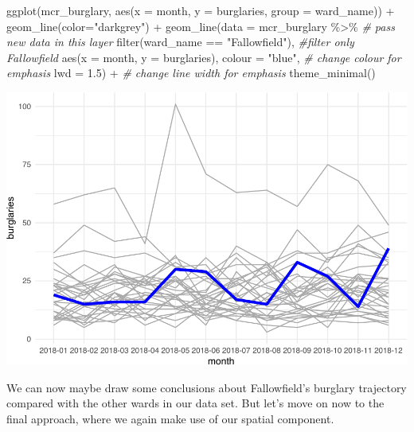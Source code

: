 \documentclass[
]{book}
\newenvironment{Shaded}{\begin{snugshade}}{\end{snugshade}}
\newcommand{\AttributeTok}[1]{\textcolor[rgb]{0.77,0.63,0.00}{#1}}
\newcommand{\CommentTok}[1]{\textcolor[rgb]{0.56,0.35,0.01}{\textit{#1}}}
\newcommand{\FloatTok}[1]{\textcolor[rgb]{0.00,0.00,0.81}{#1}}
\newcommand{\FunctionTok}[1]{\textcolor[rgb]{0.00,0.00,0.00}{#1}}
\newcommand{\NormalTok}[1]{#1}
\newcommand{\SpecialCharTok}[1]{\textcolor[rgb]{0.00,0.00,0.00}{#1}}
\newcommand{\StringTok}[1]{\textcolor[rgb]{0.31,0.60,0.02}{#1}}
\begin{document}
\begin{Shaded}
\begin{Highlighting}[]
\FunctionTok{ggplot}\NormalTok{(mcr\_burglary, }
       \FunctionTok{aes}\NormalTok{(}\AttributeTok{x =}\NormalTok{ month, }
           \AttributeTok{y =}\NormalTok{ burglaries, }
           \AttributeTok{group =}\NormalTok{ ward\_name)) }\SpecialCharTok{+} 
  \FunctionTok{geom\_line}\NormalTok{(}\AttributeTok{color=}\StringTok{"darkgrey"}\NormalTok{) }\SpecialCharTok{+} 
  \FunctionTok{geom\_line}\NormalTok{(}\AttributeTok{data =}\NormalTok{ mcr\_burglary }\SpecialCharTok{\%\textgreater{}\%}    \CommentTok{\# pass new data in this layer}
              \FunctionTok{filter}\NormalTok{(ward\_name }\SpecialCharTok{==} \StringTok{"Fallowfield"}\NormalTok{),  }\CommentTok{\#filter only Fallowfield }
            \FunctionTok{aes}\NormalTok{(}\AttributeTok{x =}\NormalTok{ month, }
           \AttributeTok{y =}\NormalTok{ burglaries), }
           \AttributeTok{colour =} \StringTok{"blue"}\NormalTok{,  }\CommentTok{\# change colour for emphasis}
           \AttributeTok{lwd =} \FloatTok{1.5}\NormalTok{) }\SpecialCharTok{+} \CommentTok{\# change line width for emphasis}
  \FunctionTok{theme\_minimal}\NormalTok{()}
\end{Highlighting}
\end{Shaded}

\includegraphics{crime_mapping_files/figure-latex/unnamed-chunk-183-1.pdf}

We can now maybe draw some conclusions about Fallowfield's burglary trajectory compared with the other wards in our data set. But let's move on now to the final approach, where we again make use of our spatial component.
\end{document}
